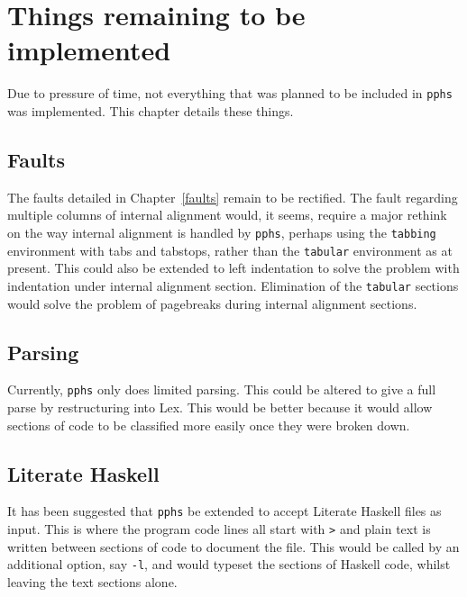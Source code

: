 \chapter{Things remaining to be implemented}

Due to pressure of time, not everything that was planned to be included in
{\tt pphs} was implemented.  This chapter details these things.

\section{Faults}

The faults detailed in Chapter~\ref{faults} remain to be rectified.  The fault
regarding multiple columns of internal alignment would, it seems, require a
major rethink on the way internal alignment is handled by {\tt pphs}, perhaps
using the {\tt tabbing} environment with tabs and tabstops, rather than the
{\tt tabular} environment as at present.  This could also
be extended to left indentation to solve the problem with indentation under
internal alignment section.  Elimination of the {\tt tabular} sections would solve
the problem of pagebreaks during internal alignment sections.

\section{Parsing}

Currently, {\tt pphs} only does limited parsing.  This could be altered to
give a full parse by restructuring into Lex.  This would be better because
it would allow sections of code to be classified more easily once they were
broken down.

\section{Literate Haskell}

It has been suggested that {\tt pphs} be extended to accept Literate Haskell
files as input.  This is where the program code lines all start with {\tt >}
and plain text is written between sections of code to document the file.
This would be called by an additional option, say {\tt -l}, and would typeset
the sections of Haskell code, whilst leaving the text sections alone.